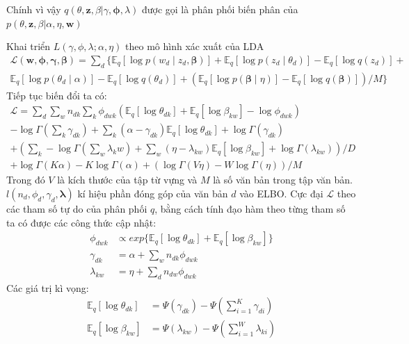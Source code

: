 \documentclass[fontsize=13pt]{scrartcl}
\begin{document}
Chính vì vậy  $q(\theta,\mathbf{z},\beta| \gamma,\boldsymbol\phi,\lambda)$ được gọi là phân phối biến phân của $p(\theta,\mathbf{z},\beta | \alpha,\eta,\mathbf{w})$
\par 
Khai triển $L(\gamma,\phi,\lambda;\alpha,\eta)$ theo mô hình xác xuất của LDA
\begin{equation}
\begin{split}
 \mathcal{L}(\mathbf{w},\boldsymbol\phi, \boldsymbol\gamma,\boldsymbol\beta) = 
\sum_d \{ \mathbb{E}_q[\log p(w_d \mid z_d,\boldsymbol\beta)] + \mathbb{E}_q[\log p(z_d\mid \theta_d)]  -\mathbb{E}_q[\log q(z_d)] + \\ \mathbb{E}_q[\log p(\theta_d \mid \alpha)] - \mathbb{E}_q[\log q(\theta_d)]  +(\mathbb{E}_q[\log p(\boldsymbol\beta \mid \eta)] - \mathbb{E}_q[\log q(\boldsymbol\beta)])/M \}
\end{split}
\end{equation}
Tiếp tục biến đổi ta có:
\begin{equation}
\begin{split}
\mathcal{L} = \sum_{d}\sum_{w}n_{dk}\sum_{k}\phi_{dwk}(\mathbb{E}_{q}[\log\theta_{dk}] +\mathbb{E}_q[\log\beta_{kw}] - \log\phi_{dwk} ) \\
- \log\Gamma(\sum_{k}\gamma_{dk}) + \sum_{k}(\alpha - \gamma_{dk})\mathbb{E}_q[\log \theta_{dk}] + \log\Gamma(\gamma_{dk})\\
+(\sum_{k} -\log\Gamma(\sum_{w}\lambda_kw) + \sum_{w}(\eta - \lambda_{kw})\mathbb{E}_q[\log\beta_{kw}] + \log\Gamma(\lambda_{kw}))/D\\
+ \log\Gamma(K\alpha) - K\log\Gamma(\alpha) + (\log\Gamma(V\eta) - W\log\Gamma(\eta))/M
\end{split}
\end{equation}
Trong đó $V$ là kích thước của tập từ vựng và $M$ là số văn bản trong tập văn bản. $l(n_d,\phi_d,\gamma_d,\boldsymbol\lambda)$ kí hiệu phần đóng góp của văn bản $d$ vào ELBO. Cực đại $\mathcal{L}$ theo các tham số tự do của phân phối $q$, bằng cách tính đạo hàm theo từng tham số ta có được các công thức cập nhật:
\begin{align}
\phi_{dwk} &\propto exp\{\mathbb{E}_q[\log\theta_{dk}] + \mathbb{E}_q[\log\beta_{kw}]\} \label{eq:variantphi}\\
\gamma_{dk} &= \alpha + \sum_{w}n_{dk}\phi_{dwk} \label{varaintgamma}\\
\lambda_{kw} &= \eta + \sum_{d}n_{dw}\phi_{dwk} 
\end{align}
Các giá trị kì vọng:
\begin{align}
\mathbb{E}_q[\log\theta_{dk}] &= \Psi(\gamma_{dk}) - \Psi(\sum_{i=1}^{K}\gamma_{di})\\
\mathbb{E}_q[\log\beta_{kw}] &= \Psi(\lambda_{kw}) - \Psi(\sum_{i=1}^{W}\lambda_{ki})
\end{align}
\end{document}
